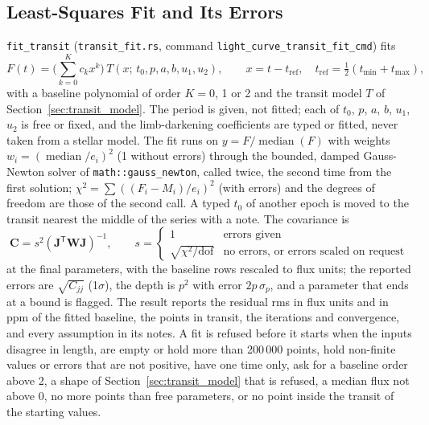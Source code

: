 \documentclass[11pt,a4paper]{article}
\newcommand{\code}[1]{\texttt{\small #1}}
\newcommand{\mat}[1]{\mathbf{#1}}
\begin{document}
    \subsection{Least-Squares Fit and Its Errors}
    \label{sec:transit_fit}

    \code{fit\_transit} (\code{transit\_fit.rs}, command \code{light\_curve\_transit\_fit\_cmd}) fits
    \begin{equation}
        F(t) = \Big(\sum_{k=0}^{K} c_k x^k\Big)\, T(x;\, t_0, p, a, b, u_1, u_2), \qquad x = t - t_{\text{ref}}, \quad t_{\text{ref}} = \tfrac{1}{2}(t_{\min} + t_{\max}),
    \end{equation}
    with a baseline polynomial of order $K = 0$, 1 or 2 and the transit model $T$ of Section~\ref{sec:transit_model}. The period is given, not fitted; each of $t_0$, $p$, $a$, $b$, $u_1$, $u_2$ is free or fixed, and the limb-darkening coefficients are typed or fitted, never taken from a stellar model. The fit runs on $y = F/\operatorname{median}(F)$ with weights $w_i = (\operatorname{median}/e_i)^2$ (1 without errors) through the bounded, damped Gauss-Newton solver of \code{math::gauss\_newton}, called twice, the second time from the first solution; $\chi^2 = \sum ((F_i - M_i)/e_i)^2$ (with errors) and the degrees of freedom are those of the second call. A typed $t_0$ of another epoch is moved to the transit nearest the middle of the series with a note. The covariance is
    \begin{equation}
        \mat{C} = s^2 \left(\mat{J}^{\mathsf{T}} \mat{W} \mat{J}\right)^{-1}, \qquad
        s = \begin{cases} 1 & \text{errors given} \\ \sqrt{\chi^2/\text{dof}} & \text{no errors, or errors scaled on request} \end{cases}
    \end{equation}
    at the final parameters, with the baseline rows rescaled to flux units; the reported errors are $\sqrt{C_{jj}}$ (1$\sigma$), the depth is $p^2$ with error $2p\,\sigma_p$, and a parameter that ends at a bound is flagged. The result reports the residual rms in flux units and in ppm of the fitted baseline, the points in transit, the iterations and convergence, and every assumption in its notes. A fit is refused before it starts when the inputs disagree in length, are empty or hold more than 200\,000 points, hold non-finite values or errors that are not positive, have one time only, ask for a baseline order above 2, a shape of Section~\ref{sec:transit_model} that is refused, a median flux not above 0, no more points than free parameters, or no point inside the transit of the starting values.
\end{document}
